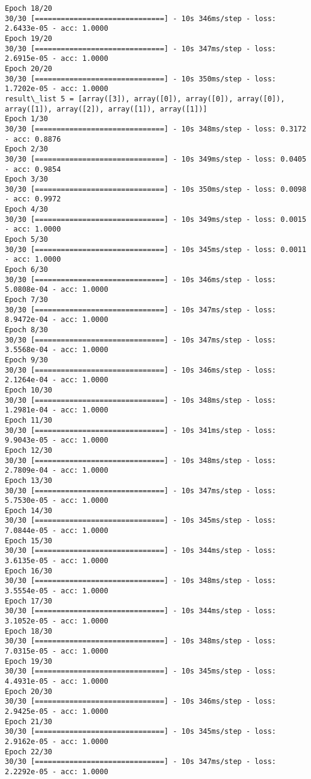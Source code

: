 \documentclass[11pt]{article}
\begin{document}
\begin{Verbatim}[commandchars=\\\{\}]
Epoch 18/20
30/30 [==============================] - 10s 346ms/step - loss: 2.6433e-05 - acc: 1.0000
Epoch 19/20
30/30 [==============================] - 10s 347ms/step - loss: 2.6915e-05 - acc: 1.0000
Epoch 20/20
30/30 [==============================] - 10s 350ms/step - loss: 1.7202e-05 - acc: 1.0000
result\_list 5 = [array([3]), array([0]), array([0]), array([0]), array([1]), array([2]), array([1]), array([1])]
Epoch 1/30
30/30 [==============================] - 10s 348ms/step - loss: 0.3172 - acc: 0.8876
Epoch 2/30
30/30 [==============================] - 10s 349ms/step - loss: 0.0405 - acc: 0.9854
Epoch 3/30
30/30 [==============================] - 10s 350ms/step - loss: 0.0098 - acc: 0.9972
Epoch 4/30
30/30 [==============================] - 10s 349ms/step - loss: 0.0015 - acc: 1.0000
Epoch 5/30
30/30 [==============================] - 10s 345ms/step - loss: 0.0011 - acc: 1.0000
Epoch 6/30
30/30 [==============================] - 10s 346ms/step - loss: 5.0808e-04 - acc: 1.0000
Epoch 7/30
30/30 [==============================] - 10s 347ms/step - loss: 8.9472e-04 - acc: 1.0000
Epoch 8/30
30/30 [==============================] - 10s 347ms/step - loss: 3.5568e-04 - acc: 1.0000
Epoch 9/30
30/30 [==============================] - 10s 346ms/step - loss: 2.1264e-04 - acc: 1.0000
Epoch 10/30
30/30 [==============================] - 10s 348ms/step - loss: 1.2981e-04 - acc: 1.0000
Epoch 11/30
30/30 [==============================] - 10s 341ms/step - loss: 9.9043e-05 - acc: 1.0000
Epoch 12/30
30/30 [==============================] - 10s 348ms/step - loss: 2.7809e-04 - acc: 1.0000
Epoch 13/30
30/30 [==============================] - 10s 347ms/step - loss: 5.7530e-05 - acc: 1.0000
Epoch 14/30
30/30 [==============================] - 10s 345ms/step - loss: 7.0844e-05 - acc: 1.0000
Epoch 15/30
30/30 [==============================] - 10s 344ms/step - loss: 3.6135e-05 - acc: 1.0000
Epoch 16/30
30/30 [==============================] - 10s 348ms/step - loss: 3.5554e-05 - acc: 1.0000
Epoch 17/30
30/30 [==============================] - 10s 344ms/step - loss: 3.1052e-05 - acc: 1.0000
Epoch 18/30
30/30 [==============================] - 10s 348ms/step - loss: 7.0315e-05 - acc: 1.0000
Epoch 19/30
30/30 [==============================] - 10s 345ms/step - loss: 4.4931e-05 - acc: 1.0000
Epoch 20/30
30/30 [==============================] - 10s 346ms/step - loss: 2.9425e-05 - acc: 1.0000
Epoch 21/30
30/30 [==============================] - 10s 345ms/step - loss: 2.9162e-05 - acc: 1.0000
Epoch 22/30
30/30 [==============================] - 10s 347ms/step - loss: 2.2292e-05 - acc: 1.0000

\end{Verbatim}
\end{document}
